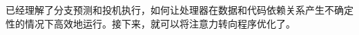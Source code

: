 已经理解了分支预测和投机执行，如何让处理器在数据和代码依赖关系产生不确定性的情况下高效地运行。接下来，就可以将注意力转向程序优化了。





























































